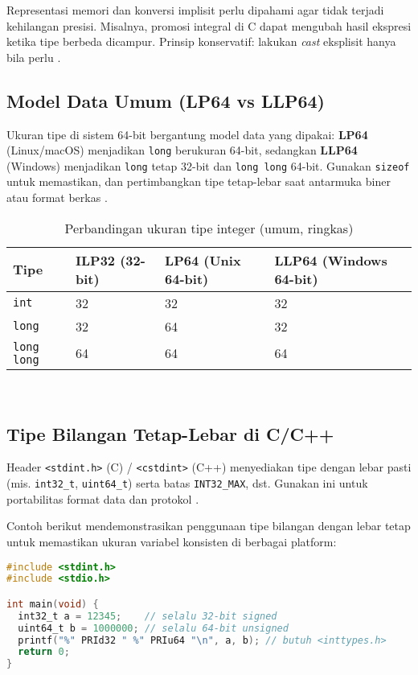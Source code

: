 \documentclass[../main.tex]{subfiles}
\begin{document}
Representasi memori dan konversi implisit perlu dipahami agar tidak terjadi kehilangan presisi. Misalnya, promosi integral di C dapat mengubah hasil ekspresi ketika tipe berbeda dicampur. Prinsip konservatif: lakukan \emph{cast} eksplisit hanya bila perlu \parencite{gnu-c-manual,cpp-reference}.

\subsection{Model Data Umum (LP64 vs LLP64)}
Ukuran tipe di sistem 64-bit bergantung model data yang dipakai: \textbf{LP64} (Linux/macOS) menjadikan \texttt{long} berukuran 64-bit, sedangkan \textbf{LLP64} (Windows) menjadikan \texttt{long} tetap 32-bit dan \texttt{long long} 64-bit. Gunakan \texttt{sizeof} untuk memastikan, dan pertimbangkan tipe tetap-lebar saat antarmuka biner atau format berkas \parencite{wikipedia-data-models,cpp-fundamental-types}.

\begin{table}[H]
  \centering
  \caption{Perbandingan ukuran tipe integer (umum, ringkas)}
  \small
  \begin{tabular}{@{}llll@{}}
    \toprule
    Tipe & ILP32 (32-bit) & LP64 (Unix 64-bit) & LLP64 (Windows 64-bit) \\
    \midrule
    \texttt{int}       & 32 & 32 & 32 \\
    \texttt{long}      & 32 & 64 & 32 \\
    \texttt{long long} & 64 & 64 & 64 \\
    \bottomrule
  \end{tabular}
  \\\parencite{wikipedia-data-models}
\end{table}

\subsection{Tipe Bilangan Tetap-Lebar di C/C++}
Header \texttt{<stdint.h>} (C) / \texttt{<cstdint>} (C++) menyediakan tipe dengan lebar pasti (mis. \texttt{int32\_t}, \texttt{uint64\_t}) serta batas \texttt{INT32\_MAX}, dst. Gunakan ini untuk portabilitas format data dan protokol \parencite{c-std-integer-types,cpp-numeric-limits}.

Contoh berikut mendemonstrasikan penggunaan tipe bilangan dengan lebar tetap untuk memastikan ukuran variabel konsisten di berbagai platform:

\begin{lstlisting}[language=C, caption={Contoh penggunaan <stdint.h> di C}]
#include <stdint.h>
#include <stdio.h>

int main(void) {
  int32_t a = 12345;    // selalu 32-bit signed
  uint64_t b = 1000000; // selalu 64-bit unsigned
  printf("%" PRId32 " %" PRIu64 "\n", a, b); // butuh <inttypes.h>
  return 0;
}
\end{lstlisting}
\end{document}
